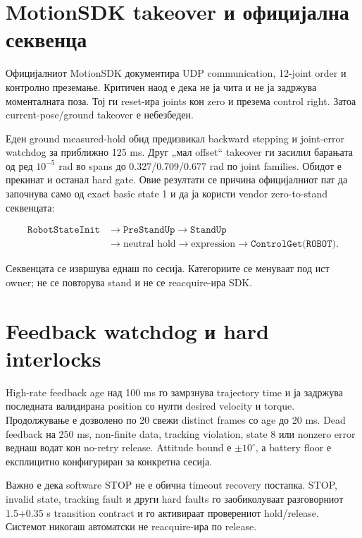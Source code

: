\section{MotionSDK takeover и официјална секвенца}

Официјалниот MotionSDK документира UDP communication, 12-joint order и
контролно преземање. Критичен наод е
дека  не ја чита и не ја задржува моменталната поза. Тој
ги reset-ира joints кон zero и презема control right. Затоа current-pose/ground
takeover е небезбеден.

Еден ground measured-hold обид предизвикал backward stepping и joint-error
watchdog за приближно 125 ms. Друг „мал offset“ takeover ги засилил барањата од
ред $10^{-5}$ rad во spans до 0.327/0.709/0.677 rad по joint families. Обидот е
прекинат и  останал hard gate.
Овие резултати се причина официјалниот пат да започнува само од exact basic
state 1 и да ја користи vendor zero-to-stand секвенцата:

\begin{equation}
\begin{aligned}
\texttt{RobotStateInit} &\rightarrow \texttt{PreStandUp}
\rightarrow \texttt{StandUp} \\
&\rightarrow \text{neutral hold}
\rightarrow \text{expression} \rightarrow \texttt{ControlGet(ROBOT)}.
\end{aligned}
\label{eq:official-sequence}
\end{equation}

Секвенцата се извршува еднаш по сесија. Категориите се менуваат под ист owner;
не се повторува stand и не се reacquire-ира SDK.

\section{Feedback watchdog и hard interlocks}

High-rate feedback age над 100 ms го замрзнува trajectory time и ја задржува
последната валидирана position со нулти desired velocity и torque. Продолжување
е дозволено по 20 свежи distinct frames со age до 20 ms. Dead feedback на
250 ms, non-finite data, tracking violation, state 8 или nonzero error веднаш
водат кон no-retry release. Attitude bound е $\pm10^{\circ}$, а battery floor
е експлицитно конфигуриран за конкретна сесија.

Важно е дека software STOP не е обична timeout recovery постапка. STOP,
invalid state, tracking fault и други hard faults го заобиколуваат
разговорниот 1.5+0.35 s transition contract и го активираат проверениот
hold/release. Системот никогаш автоматски не reacquire-ира по release.


